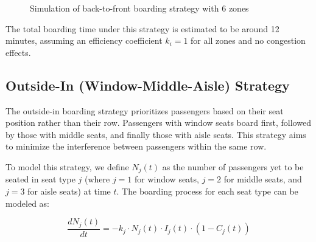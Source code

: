 \documentclass[12pt,a4paper]{article}
\begin{document}
\begin{figure}[H]
\centering
{}
\caption{Simulation of back-to-front boarding strategy with 6 zones}
\label{fig:back_to_front}
\end{figure}

The total boarding time under this strategy is estimated to be around 12 minutes, assuming an efficiency coefficient $k_i = 1$ for all zones and no congestion effects.

\subsection{Outside-In (Window-Middle-Aisle) Strategy}

The outside-in boarding strategy prioritizes passengers based on their seat position rather than their row. Passengers with window seats board first, followed by those with middle seats, and finally those with aisle seats. This strategy aims to minimize the interference between passengers within the same row.

To model this strategy, we define $N_j(t)$ as the number of passengers yet to be seated in seat type $j$ (where $j = 1$ for window seats, $j = 2$ for middle seats, and $j = 3$ for aisle seats) at time $t$. The boarding process for each seat type can be modeled as:

\begin{equation}
\frac{dN_j(t)}{dt} = -k_j \cdot N_j(t) \cdot I_j(t) \cdot (1 - C_j(t))
\label{eq:seat_type_boarding}
\end{equation}
\end{document}
